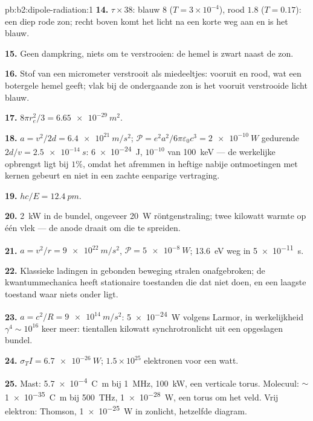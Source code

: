 \begin{solution}{pb:b2:dipole-radiation:1}
\textbf{14.} $\tau \times 38$: blauw $8$ ($T = 3 \times 10^{-4}$), rood
$1.8$ ($T = 0.17$): een diep rode zon; recht boven komt het licht na een
korte weg aan en is het blauw.

\textbf{15.} Geen dampkring, niets om te verstrooien: de hemel is zwart
naast de zon.

\textbf{16.} Stof van een micrometer verstrooit als miedeeltjes: vooruit en
rood, wat een botergele hemel geeft; vlak bij de ondergaande zon is het
vooruit verstrooide licht blauw.

\textbf{17.} $8\pi r_e^2/3 = \qty{6.65e-29}{m^2}$.

\textbf{18.} $a = v^2/2d = \qty{6.4e21}{m/s^2}$;
$\mathcal P = e^2a^2/6\pi\varepsilon_0c^3 =
\qty{2e-10}{W}$ gedurende
$2d/v = \qty{2.5e-14}{s}$: \qty{6e-24}{J}, $10^{-10}$ van \qty{100}{keV} ---
de werkelijke opbrengst ligt bij $1\%$, omdat het afremmen in heftige nabije
ontmoetingen met kernen gebeurt en niet in een zachte eenparige vertraging.

\textbf{19.} $hc/E = \qty{12.4}{pm}$.

\textbf{20.} \qty{2}{kW} in de bundel, ongeveer \qty{20}{W} röntgenstraling;
twee kilowatt warmte op één vlek --- de anode draait om die te spreiden.

\textbf{21.} $a = v^2/r = \qty{9e22}{m/s^2}$, $\mathcal P = \qty{5e-8}{W}$;
\qty{13.6}{eV} weg in \qty{5e-11}{s}.

\textbf{22.} Klassieke ladingen in gebonden beweging stralen onafgebroken;
de kwantummechanica heeft stationaire toestanden die dat niet doen, en een
laagste toestand waar niets onder ligt.

\textbf{23.} $a = c^2/R = \qty{9e14}{m/s^2}$: \qty{5e-24}{W} volgens Larmor,
in werkelijkheid $\gamma^4 \sim 10^{16}$ keer meer: tientallen kilowatt
synchrotronlicht uit een opgeslagen bundel.

\textbf{24.} $\sigma_TI = \qty{6.7e-26}{W}$; $1.5 \times 10^{25}$ elektronen
voor een watt.

\textbf{25.} Mast: \qty{5.7e-4}{C.m} bij \qty{1}{MHz}, \qty{100}{kW}, een
verticale torus. Molecuul: $\sim$\qty{1e-35}{C.m} bij \qty{500}{THz},
\qty{1e-28}{W}, een torus om het veld. Vrij elektron: Thomson,
\qty{1e-25}{W} in zonlicht, hetzelfde diagram.
\end{solution}
